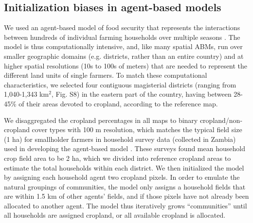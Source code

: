 \documentclass{pnastwo}
\begin{document}
\begin{article}
\subsection{Initialization biases in agent-based models}
We used an agent-based model of food security that represents the interactions between hundreds of individual farming households over multiple seasons \cite{chen_dependency_2013}. The model is thus computationally intensive, and, like many spatial ABMs, run over smaller geographic domains (e.g. districts, rather than an entire country) and at higher spatial resolutions (10s to 100s of meters) that are needed to represent the different land units of single farmers. To match these computational characteristics, we selected four contiguous magisterial districts (ranging from 1,040-1,343 km$^2$, Fig. S8) in the eastern part of the country, having between 28-45\% of their areas devoted to cropland, according to the reference map. 

We disaggregated the cropland percentages in all maps to binary cropland/non-cropland cover types with 100 m resolution, which matches the typical field size (1 ha) for smallholder farmers in household survey data (collected in Zambia) used in developing the agent-based model \cite{chen_dependency_2013}. These surveys found mean household crop field area to be 2 ha, which we divided into reference cropland areas to estimate the total households within each district. We then initialized the model by assigning each household agent two cropland pixels. In order to emulate the natural groupings of communities, the model only assigns a household fields that are within 1.5 km of other agents' fields, and if those pixels have not already been allocated to another agent. The model thus iteratively grows ``communities'' until all households are assigned cropland, or all available cropland is allocated. 


\end{article}
\end{document}
